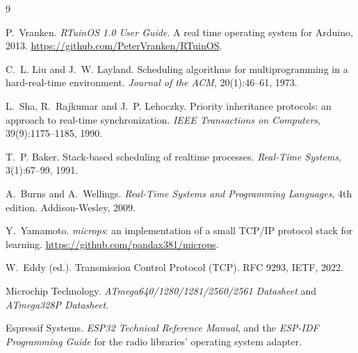\begin{thebibliography}{9}

 P.~Vranken. \emph{RTuinOS 1.0 User Guide}. A real time operating
system for Arduino, 2013. \url{https://github.com/PeterVranken/RTuinOS}.

 C.~L. Liu and J.~W. Layland. Scheduling algorithms for
multiprogramming in a hard-real-time environment. \emph{Journal of the ACM},
20(1):46--61, 1973.

 L.~Sha, R.~Rajkumar and J.~P. Lehoczky. Priority inheritance
protocols: an approach to real-time synchronization. \emph{IEEE Transactions on
Computers}, 39(9):1175--1185, 1990.

 T.~P. Baker. Stack-based scheduling of realtime processes.
\emph{Real-Time Systems}, 3(1):67--99, 1991.

 A.~Burns and A.~Wellings. \emph{Real-Time Systems and
Programming Languages}, 4th edition. Addison-Wesley, 2009.

 Y.~Yamamoto. \emph{microps}: an implementation of a small TCP/IP
protocol stack for learning. \url{https://github.com/pandax381/microps}.

 W.~Eddy (ed.). Transmission Control Protocol (TCP). RFC 9293,
IETF, 2022.

 Microchip Technology. \emph{ATmega640/1280/1281/2560/2561 Datasheet}
and \emph{ATmega328P Datasheet}.

 Espressif Systems. \emph{ESP32 Technical Reference Manual}, and the
\emph{ESP-IDF Programming Guide} for the radio libraries' operating system adapter.

\end{thebibliography}
